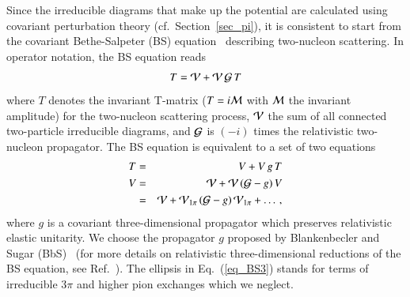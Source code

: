 \documentclass[sort&compress,preprint,3p]{elsarticle}
\begin{document}
Since the irreducible diagrams that make up the potential
are calculated using
covariant perturbation theory (cf.~Section~\ref{sec_pi}), 
it is consistent to
start from the covariant
Bethe-Salpeter (BS) equation~\cite{SB51} describing
two-nucleon scattering.
In operator notation, the BS equation reads
\begin{equation}
T = {\cal V+V\,G} \,T
\label{eq_BS}
\end{equation}
where $T$ denotes the invariant T-matrix ($T=i{\cal M}$ with ${\cal M}$ the invariant
amplitude) for the two-nucleon scattering process,
${\cal V}$ the sum of all connected two-particle irreducible diagrams, and 
${\cal G}$ is $(-i)$ times the relativistic two-nucleon propagator. 
The BS equation
is equivalent to a set of two equations
\begin{eqnarray}
{T}&=&{V}+{V} \, g \, {T}
\label{eq_bbs}
\\
{V}&=&{\cal V + V\,(G}-g)\,{V} 
\label{eq_BS2}
\\
   &=& {\cal V} + {\cal V}_{1\pi}\,({\cal G}-g)\,{\cal V}_{1\pi} 
    + \ldots \, ,
\label{eq_BS3}
\end{eqnarray}
where $g$ is a covariant three-dimensional propagator
which preserves relativistic elastic unitarity.
We choose the propagator $g$ proposed by 
Blankenbecler and Sugar (BbS)~\cite{BS66}
(for more details on relativistic three-dimensional
reductions of the BS equation, see Ref.~\cite{Mac89}). 
The ellipsis in Eq.~(\ref{eq_BS3}) stands for 
terms of irreducible $3\pi$ and higher pion exchanges
which we neglect.
\end{document}
